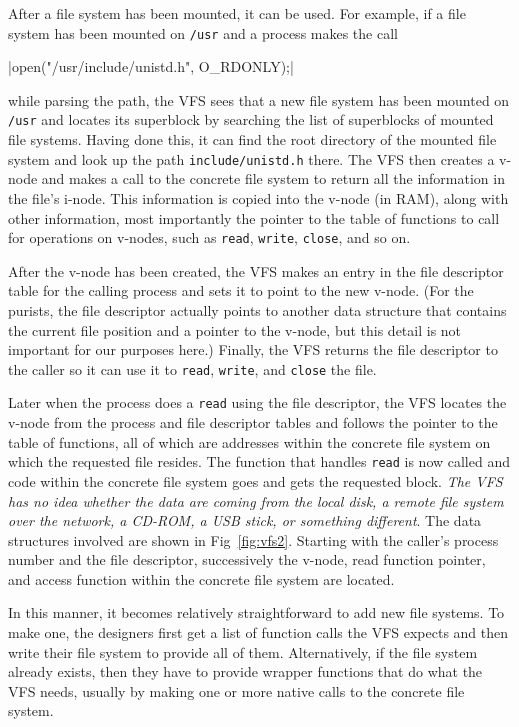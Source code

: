 After a file system has been mounted, it can be used. For example, if a file system has
been mounted on \texttt{/usr} and a process makes the call

\begin{center}
  |open("/usr/include/unistd.h", O_RDONLY);|
\end{center}

while parsing the path, the VFS sees that a new file system has been mounted on
\texttt{/usr} and locates its superblock by searching the list of superblocks of mounted
file systems. Having done this, it can find the root directory of the mounted file system
and look up the path \texttt{include/unistd.h} there. The VFS then creates a v-node and
makes a call to the concrete file system to return all the information in the file's
i-node. This information is copied into the v-node (in RAM), along with other information,
most importantly the pointer to the table of functions to call for operations on v-nodes,
such as \texttt{read}, \texttt{write}, \texttt{close}, and so on.

After the v-node has been created, the VFS makes an entry in the file descriptor table for
the calling process and sets it to point to the new v-node. (For the purists, the file
descriptor actually points to another data structure that contains the current file
position and a pointer to the v-node, but this detail is not important for our purposes
here.) Finally, the VFS returns the file descriptor to the caller so it can use it to
\texttt{read}, \texttt{write}, and \texttt{close} the file.

Later when the process does a \texttt{read} using the file descriptor, the VFS locates the
v-node from the process and file descriptor tables and follows the pointer to the table of
functions, all of which are addresses within the concrete file system on which the
requested file resides. The function that handles \texttt{read} is now called and code
within the concrete file system goes and gets the requested block. \emph{The VFS has no idea
  whether the data are coming from the local disk, a remote file system over the network,
  a CD-ROM, a USB stick, or something different}. The data structures involved are shown
in Fig~\ref{fig:vfs2}. Starting with the caller's process number and the file descriptor,
successively the v-node, read function pointer, and access function within the concrete
file system are located.

In this manner, it becomes relatively straightforward to add new file systems.  To make
one, the designers first get a list of function calls the VFS expects and then write their
file system to provide all of them. Alternatively, if the file system already exists, then
they have to provide wrapper functions that do what the VFS needs, usually by making one
or more native calls to the concrete file system.


